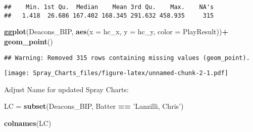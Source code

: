 \documentclass[]{article}
\newenvironment{Shaded}{\begin{snugshade}}{\end{snugshade}}
\newcommand{\KeywordTok}[1]{\textcolor[rgb]{0.13,0.29,0.53}{\textbf{#1}}}
\newcommand{\DataTypeTok}[1]{\textcolor[rgb]{0.13,0.29,0.53}{#1}}
\newcommand{\StringTok}[1]{\textcolor[rgb]{0.31,0.60,0.02}{#1}}
\newcommand{\OperatorTok}[1]{\textcolor[rgb]{0.81,0.36,0.00}{\textbf{#1}}}
\newcommand{\NormalTok}[1]{#1}
\begin{document}
\begin{verbatim}
##    Min. 1st Qu.  Median    Mean 3rd Qu.    Max.    NA's 
##   1.418  26.686 167.402 168.345 291.632 458.935     315
\end{verbatim}

\begin{Shaded}
\begin{Highlighting}[]
\KeywordTok{ggplot}\NormalTok{(Deacons_BIP, }\KeywordTok{aes}\NormalTok{(}\DataTypeTok{x =}\NormalTok{ hc_x, }\DataTypeTok{y =}\NormalTok{ hc_y, }\DataTypeTok{color =}\NormalTok{ PlayResult))}\OperatorTok{+}
\StringTok{  }\KeywordTok{geom_point}\NormalTok{()}
\end{Highlighting}
\end{Shaded}

\begin{verbatim}
## Warning: Removed 315 rows containing missing values (geom_point).
\end{verbatim}

\texttt{[image: Spray\_Charts\_files/figure-latex/unnamed-chunk-2-1.pdf]}

Adjust Name for updated Spray Charts:

\begin{Shaded}
\begin{Highlighting}[]
\NormalTok{LC =}\StringTok{ }\KeywordTok{subset}\NormalTok{(Deacons_BIP, Batter }\OperatorTok{==}\StringTok{ 'Lanzilli, Chris'}\NormalTok{)}

\KeywordTok{colnames}\NormalTok{(LC)}
\end{Highlighting}
\end{Shaded}
\end{document}
